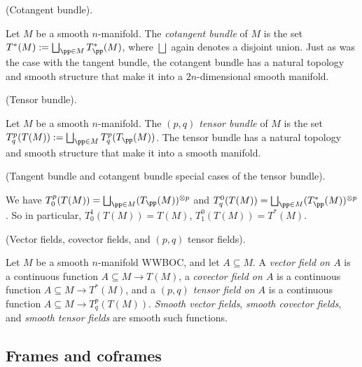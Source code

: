 \begin{defn}
     (Cotangent bundle).
    
    Let $M$ be a smooth $n$-manifold. The \textit{cotangent bundle} of $M$ is the set $T^*(M) := \bigsqcup_{\pp \in M} T_\pp^*(M)$, where $\bigsqcup$ again denotes a disjoint union. Just as was the case with the tangent bundle, the cotangent bundle has a natural topology and smooth structure that make it into a $2n$-dimensional smooth manifold.
\end{defn}

\begin{defn}
     (Tensor bundle).
    
    Let $M$ be a smooth $n$-manifold. The \textit{$(p, q)$ tensor bundle} of $M$ is the set $T^p_q(T(M)) := \bigsqcup_{\pp \in M} T^p_q(T_\pp(M))$. The tensor bundle has a natural topology and smooth structure that make it into a smooth manifold.
\end{defn}

\begin{remark}
     (Tangent bundle and cotangent bundle special cases of the tensor bundle).
    
    We have $T^p_0(T(M)) = \bigsqcup_{\pp \in M} (T_\pp(M))^{\otimes p}$ and $T^0_q(T(M)) = \bigsqcup_{\pp \in M} (T_\pp^*(M))^{\otimes p}$. So in particular, $T^1_0(T(M)) = T(M)$, $T^0_1(T(M)) = T^*(M)$.
    
\end{remark}

\begin{defn}
     (Vector fields, covector fields, and $(p, q)$ tensor fields).
    
    Let $M$ be a smooth $n$-manifold WWBOC, and let $A \subseteq M$. A \textit{vector field on $A$} is a continuous function $A \subseteq M \rightarrow T(M)$, a \textit{covector field on $A$} is a continuous function $A \subseteq M \rightarrow T^*(M)$, and a \textit{$(p, q)$ tensor field on $A$} is a continuous function $A \subseteq M \rightarrow T^p_q(T(M))$. \textit{Smooth vector fields}, \textit{smooth covector fields}, and \textit{smooth tensor fields} are smooth such functions.
\end{defn}

\subsection*{Frames and coframes}

